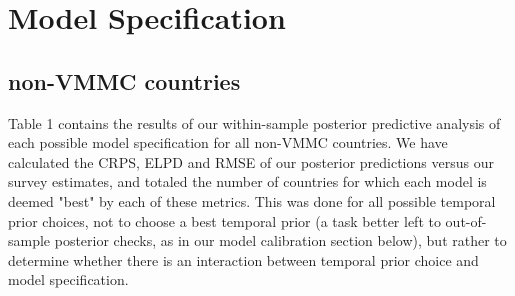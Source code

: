 \documentclass{article}
\begin{document}
\section{Model Specification}
\label{sec:org8802288}

\subsection{non-VMMC countries}
\label{sec:org09db5e8}

Table 1 contains the results of our within-sample posterior predictive analysis of each possible model specification for all non-VMMC countries. We have calculated the CRPS, ELPD and RMSE of our posterior predictions versus our survey estimates, and totaled the number of countries for which each model is deemed "best" by each of these metrics. This was done for all possible temporal prior choices, not to choose a best temporal prior (a task better left to out-of-sample posterior checks, as in our model calibration section below), but rather to determine whether there is an interaction between temporal prior choice and model specification.

\vspace{10 mm}

\end{document}
